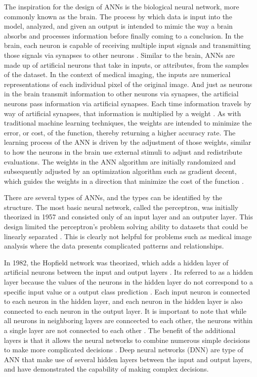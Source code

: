 \documentclass[sigconf]{acmart}
\begin{document}
The inspiration for the design of ANNs is the biological neural network, more commonly known as the brain. The process by which data is input into the model, analyzed, and given an output is intended to mimic the way a brain absorbs and processes information before finally coming to a conclusion. In the brain, each neuron is capable of receiving multiple input signals and transmitting those signals via  synapses to other neurons \cite{cite05}. Similar to the brain, ANNs are made up of artificial neurons that take in inputs, or attributes, from the samples of the dataset. In the context of medical imaging, the inputs are numerical representations of each individual pixel of the original image. And just as neurons in the brain transmit information to other neurons via synapses, the artificial neurons pass information via artificial synapses. Each time information travels by way of artificial synapses, that information is multiplied by a weight \cite{cite05}. As with traditional machine learning techniques, the weights are intended to minimize the error, or cost, of the function, thereby returning a higher accuracy rate. The learning process of the ANN is driven by the adjustment of those weights, similar to how the neurons in the brain use external stimuli to adjust and redistribute evaluations. The weights in the ANN algorithm are initially randomized and subsequently adjusted by an optimization algorithm such as gradient decent, which guides the weights in a direction that minimize the cost of the function \cite{cite05}. 

There are several types of ANNs, and the types can be identified by the structure. The most basic neural network, called the perceptron, was initially theorized in 1957 and consisted only of an input layer and an outputer layer. This design limited the perceptron's problem solving ability to datasets that could be linearly separated \cite{cite08}. This is clearly not helpful for problems such as medical image analysis where the data presents complicated patterns and relationships.

In 1982, the Hopfield network was theorized, which adds a hidden layer of artificial neurons between the input and output layers \cite{cite08}. Its referred to as a hidden layer because the values of the neurons in the hidden layer do not correspond to a specific input value or a output class prediction \cite{cite05}. Each input neuron is connected to each neuron in the hidden layer, and each neuron in the hidden layer is also connected to each neuron in the output layer. It is important to note that while all neurons in neighboring layers are conncected to each other, the neurons within a single layer are not connected to each other \cite{cite06}. The benefit of the additional layers is that it allows the neural networks to combine numerous simple decisions to make more complicated decisions \cite{cite05}. Deep neural networks (DNN) are type of ANN that make use of several hidden layers between the input and output layers, and have demonstrated the capability of making complex decisions.
\end{document}
